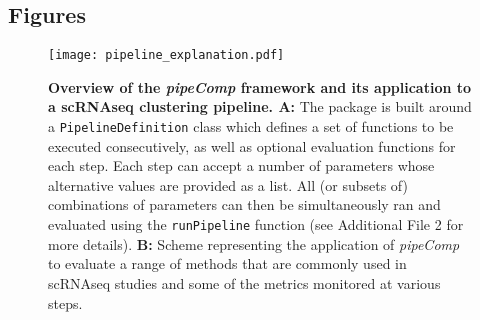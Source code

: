 \documentclass{bmcart}
\begin{document}
\begin{backmatter}




\section*{Figures}


\begin{figure}
    \centering
    \texttt{[image: pipeline\_explanation.pdf]}
    \caption{\textbf{Overview of the \textit{pipeComp} framework and its application to a scRNAseq clustering pipeline. A:} The package is built around a \texttt{PipelineDefinition} class which defines a set of functions to be executed consecutively, as well as optional evaluation functions for each step. Each step can accept a number of parameters whose alternative values are provided as a list. All (or subsets of) combinations of parameters can then be simultaneously ran and evaluated using the \texttt{runPipeline} function ({\color{red}see Additional File 2 for more details}). \textbf{B:} Scheme representing the application of \textit{pipeComp} to evaluate a range of methods that are commonly used in scRNAseq studies and some of the metrics monitored at various steps.}
    \label{fig:explanation}
\end{figure}



\end{backmatter}
\end{document}
